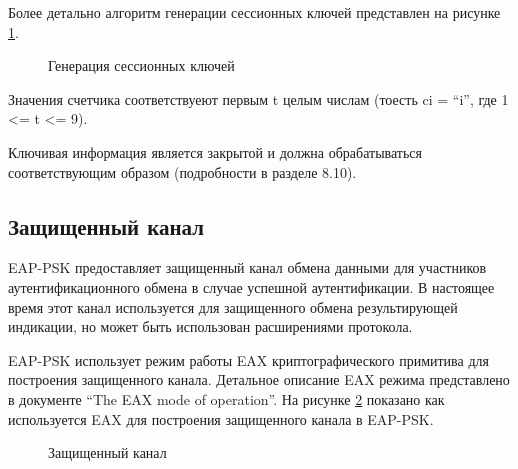 Более детально алгоритм генерации сессионных ключей представлен на рисунке \ref{img:sk_derivation2}.

\begin{figure}[h!]
\caption{Генерация сессионных ключей}
\label{img:sk_derivation2}
\end{figure}

Значения счетчика соответствуеют первым t целым числам (тоесть ci = ``i'', где 1 <= t <= 9).

Ключивая информация является закрытой и должна обрабатываться соответствующим образом (подробности в разделе 8.10).

\subsection{Защищенный канал}

EAP-PSK предоставляет защищенный канал обмена данными для участников аутентификационного обмена в случае успешной аутентификации. В настоящее время этот канал используется для защищенного обмена результирующей индикации, но может быть использован расширениями протокола.

EAP-PSK использует режим работы EAX криптографического примитива для построения защищенного канала. Детальное описание EAX режима представлено в документе ``The EAX mode of operation''. На рисунке \ref{img:protected_channel} показано как используется EAX для построения защищенного канала в EAP-PSK.

\begin{figure}[h!]
\caption{Защищенный канал}
\label{img:protected_channel}
\end{figure}

